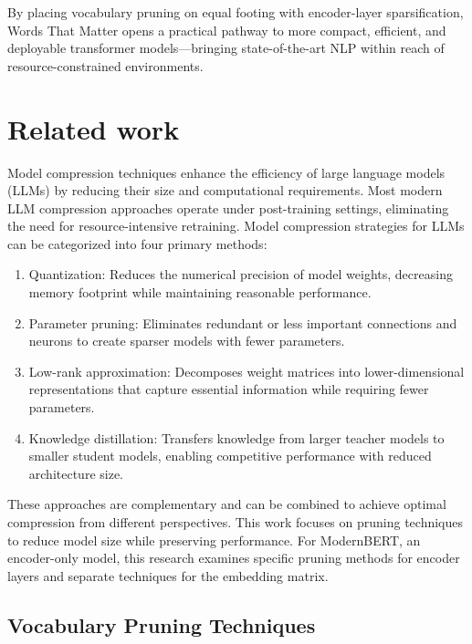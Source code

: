 \documentclass[twocolumn]{article}
\begin{document}
By placing vocabulary pruning on equal footing with encoder-layer sparsification, Words That Matter opens a practical pathway to more compact, efficient, and deployable transformer models---bringing state-of-the-art NLP within reach of resource-constrained environments.

\section{Related work}
Model compression techniques enhance the efficiency of large language models (LLMs) by reducing their size and computational requirements. Most modern LLM compression approaches operate under post-training settings, eliminating the need for resource-intensive retraining. Model compression strategies for LLMs can be categorized into four primary methods:

\begin{enumerate}
    \item Quantization: Reduces the numerical precision of model weights, decreasing memory footprint while maintaining reasonable performance.
    
    \item Parameter pruning: Eliminates redundant or less important connections and neurons to create sparser models with fewer parameters.
    
    \item Low-rank approximation: Decomposes weight matrices into lower-dimensional representations that capture essential information while requiring fewer parameters.
    
    \item Knowledge distillation: Transfers knowledge from larger teacher models to smaller student models, enabling competitive performance with reduced architecture size.
\end{enumerate}

These approaches are complementary and can be combined to achieve optimal compression from different perspectives. 
This work focuses on pruning techniques to reduce model size while preserving performance.
For ModernBERT, an encoder-only model, this research examines specific pruning methods for encoder layers and separate techniques for the embedding matrix.

\subsection{Vocabulary Pruning Techniques}
\end{document}
